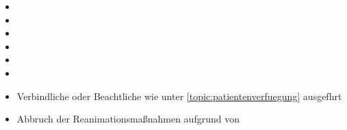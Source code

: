 \begin{itemize}
    \item {}
    \item {}
    \item {}
    \item {}
    \item {}
    \item {}
    \item Verbindliche oder Beachtliche
     wie unter
    \ref{topic:patientenverfuegung} ausgefhrt
    \item Abbruch der Reanimationsma{\ss}nahmen aufgrund
    von 
\end{itemize}

\putbib




